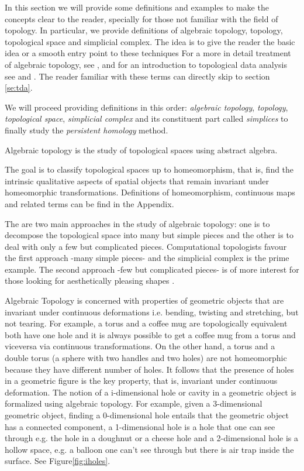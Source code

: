 \documentclass[onecollarge,runningheads]{svjour2}
\begin{document}
In this section we will provide some definitions and examples to make the concepts clear to the reader, specially for those not familiar with the field of topology. In particular, we provide definitions of algebraic topology, topology, topological space and simplicial complex. The idea is to give the reader the basic idea or a smooth entry point to these techniques For a more in detail treatment of algebraic topology, see \cite{munkres1984elements}, \cite{hatcher2001} and for an introduction to topological data analysis see \cite{carlsson2009topology} and \cite{wasserman2016topological}. The reader familiar with these terms can directly skip to section \ref{se:tda}. 

We will proceed providing definitions in this order: \emph{algebraic topology}, \emph{topology}, \emph{topological space}, \emph{simplicial complex} and its constituent part called \emph{simplices} to finally study the \emph{persistent homology} method.

\begin{definition} 
Algebraic topology is the study of topological spaces using abstract algebra. 
\end{definition}
The goal is to classify topological spaces up to homeomorphism, that is, find the intrinsic qualitative aspects of spatial objects that remain invariant under homeomorphic transformations. Definitions of homeomorphism, continuous maps and related terms can be find in the Appendix.

The are two main approaches in the study of algebraic topology: one is to decompose the topological space into many but simple pieces and the other is to deal with only a few but complicated pieces. Computational topologists favour the first approach -many simple pieces- and the simplicial complex is the prime example. The second approach -few but complicated pieces- is of more interest for those looking for aesthetically pleasing shapes \cite{edelsbrunner2010computational}. %

Algebraic Topology is concerned with properties of geometric objects that are invariant under continuous deformations i.e. bending, twisting and stretching, but not tearing. 
For example, a torus and a coffee mug are topologically equivalent both have one hole and it is always possible to get a coffee mug from a torus and viceversa via continuous transformations. On the other hand, a torus and a double torus (a sphere with two handles and two holes) are not homeomorphic because they have different number of holes. 
It follows that the presence of holes in a geometric figure is the key property, that is, invariant under continuous deformation. The notion of a i-dimensional hole or cavity in a geometric object is formalized using algebraic topology. For example, given a 3-dimensional geometric object, finding a 0-dimensional hole entails that the geometric object has a connected component, a 1-dimensional hole is a hole that one can see through e.g. the hole in a doughnut or a cheese hole and a 2-dimensional hole is a hollow space, e.g. a balloon one can't see through but there is air trap inside the surface. See Figure\ref{fig:iholes}.
\end{document}
